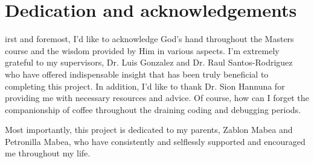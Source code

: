 %
%

\chapter*{Dedication and acknowledgements}
\begin{SingleSpace}
irst and foremost, I'd like to acknowledge God's hand throughout the Masters course and the wisdom provided by Him in various aspects. 
I'm extremely grateful to my supervisors, Dr. Luis Gonzalez and Dr. Raul Santos-Rodriguez who have offered indispensable  insight that has been truly beneficial to completing this project. In addition, I'd like to thank Dr. Sion Hannuna for providing me with necessary resources and advice. 
Of course, how can I forget the companionship of coffee throughout the draining coding and debugging periods. 


Most importantly, this project is dedicated to my parents, Zablon Mabea and Petronilla Mabea, who have consistently and selflessly supported and encouraged me throughout my life. 


\end{SingleSpace}
\clearpage